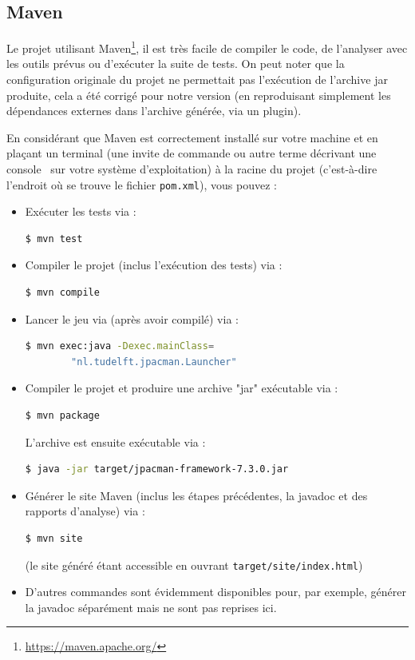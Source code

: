 \documentclass[12pt, openany]{report}
\begin{document}
\subsection{Maven}
Le projet utilisant Maven\footnote{\url{https://maven.apache.org/}}, il est très facile de compiler le code, de l'analyser avec les outils prévus ou d'exécuter la suite de tests.
On peut noter que la configuration originale du projet ne permettait pas l'exécution de l'archive jar produite, cela a été corrigé pour notre version (en reproduisant simplement les dépendances externes dans l'archive générée, via un plugin).

En considérant que Maven est correctement installé sur votre machine et en plaçant un terminal (une invite de commande ou autre terme décrivant une \og console \fg \, sur votre système d'exploitation) à la racine du projet (c'est-à-dire l'endroit où se trouve le fichier \nolinkurl{pom.xml}), vous pouvez :
\begin{itemize}
	\item Exécuter les tests via :
	\begin{lstlisting}[language=bash]
	$ mvn test
	\end{lstlisting}
	\item Compiler le projet (inclus l'exécution des tests) via :
	\begin{lstlisting}[language=bash]
	$ mvn compile
	\end{lstlisting}
	\item Lancer le jeu via (après avoir compilé) via :
	\begin{lstlisting}[language=bash]
	$ mvn exec:java -Dexec.mainClass=
		"nl.tudelft.jpacman.Launcher"
	\end{lstlisting}
	\item Compiler le projet et produire une archive "jar" exécutable via :
	\begin{lstlisting}[language=bash]
	$ mvn package
	\end{lstlisting}
	L'archive est ensuite exécutable via :
	\begin{lstlisting}[language=bash]
	$ java -jar target/jpacman-framework-7.3.0.jar
	\end{lstlisting}
	\item Générer le site Maven (inclus les étapes précédentes, la javadoc et des rapports d'analyse) via :
	\begin{lstlisting}[language=bash]
	$ mvn site
	\end{lstlisting}
	(le site généré étant accessible en ouvrant \nolinkurl{target/site/index.html})
	\item D'autres commandes sont évidemment disponibles pour, par exemple, générer la javadoc séparément mais ne sont pas reprises ici.
\end{itemize}
\end{document}
